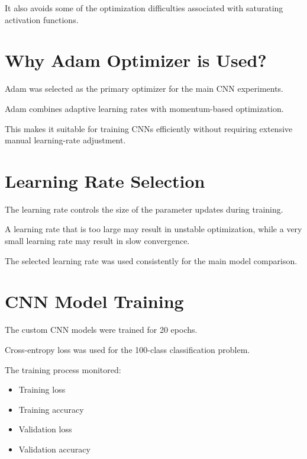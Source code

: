 \documentclass[12pt,a4paper]{report}
\begin{document}
It also avoids some of the optimization difficulties associated
with saturating activation functions.

\section{Why Adam Optimizer is Used?}

Adam was selected as the primary optimizer for the main CNN
experiments.

Adam combines adaptive learning rates with momentum-based
optimization.

This makes it suitable for training CNNs efficiently without
requiring extensive manual learning-rate adjustment.

\section{Learning Rate Selection}

The learning rate controls the size of the parameter updates
during training.

A learning rate that is too large may result in unstable
optimization, while a very small learning rate may result in
slow convergence.

The selected learning rate was used consistently for the main
model comparison.

\section{CNN Model Training}

The custom CNN models were trained for 20 epochs.

Cross-entropy loss was used for the 100-class classification
problem.

The training process monitored:

\begin{itemize}
    \item Training loss
    \item Training accuracy
    \item Validation loss
    \item Validation accuracy
\end{itemize}
\end{document}
